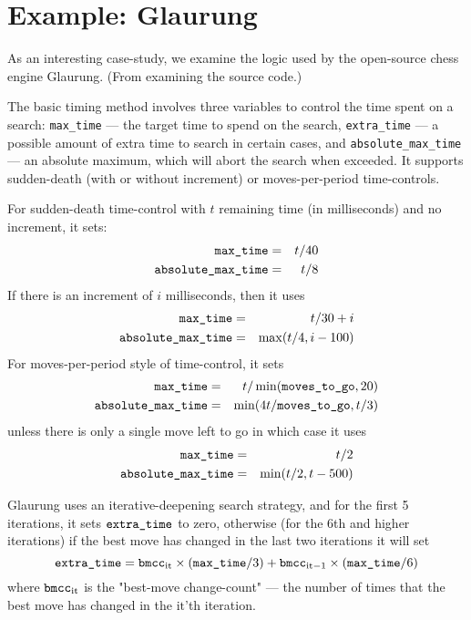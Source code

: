 \documentclass[10pt,dvipdfmx]{report}
\let\x=\times
\begin{document}
\section{Example: Glaurung}

As an interesting case-study, we examine the logic used by the open-source
chess engine Glaurung.  (From examining the source code.)

The basic timing method involves three variables to control the time
spent on a search:
\verb|max_time| --- the target time to spend on the search,
\verb|extra_time| --- a possible amount of extra time to search in certain
cases, and \verb|absolute_max_time| --- an absolute maximum, which will abort
the search when exceeded.
It supports sudden-death (with or without increment) or
moves-per-period time-controls.

For sudden-death time-control with $t$ remaining time (in milliseconds)
and no increment, it sets:
\begin{eqnarray*}
\verb|max_time| &=& t/40 \\
\verb|absolute_max_time| &=& t/8
\end{eqnarray*}
If there is an increment of $i$ milliseconds, then it uses
\begin{eqnarray*}
\verb|max_time| &=& t/30+i \\
\verb|absolute_max_time| &=& \max(t/4,i-100)
\end{eqnarray*}
For moves-per-period style of time-control, it sets
\begin{eqnarray*}
\verb|max_time| &=& t/\min(\verb|moves_to_go|,20) \\
\verb|absolute_max_time| &=& \min(4t/\verb|moves_to_go|, t/3)
\end{eqnarray*}
unless there is only a single move left to go in which case it uses
\begin{eqnarray*}
\verb|max_time| &=& t/2 \\
\verb|absolute_max_time| &=& \min(t/2,t-500)
\end{eqnarray*}

Glaurung uses an iterative-deepening search strategy, and for
the first 5 iterations, it sets $\verb|extra_time|$ to zero,
otherwise (for the 6th and higher iterations) if the best move has changed
in the last two iterations it will set
\[ \verb|extra_time|
  = {\verb|bmcc|}_{\text{it}}\x(\verb|max_time|/3)
  + {\verb|bmcc|}_{\text{it}-1}\x(\verb|max_time|/6) \]
where ${\verb|bmcc|}_{\text{it}}$ is the "best-move change-count" --- the number
of times that the best move has changed in the $\text{it}$'th iteration.
\end{document}
